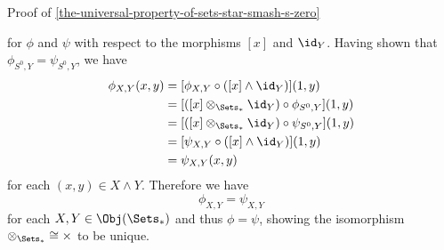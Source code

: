 \begin{Proof}{Proof of \cref{the-universal-property-of-sets-star-smash-s-zero}}
\begin{webcompile}
    \end{webcompile}
    for $\phi$ and $\psi$ with respect to the morphisms $[x]$ and $\id_{Y}$. Having shown that $\phi_{S^{0},Y}=\psi_{S^{0},Y}$, we have
    \begin{align*}
        \phi_{X,Y}(x,y) &= [\phi_{X,Y}\circ([x]\wedge\id_{Y})](1,y)\\
                        &= [([x]\otimes_{\Sets_{*}}\id_{Y})\circ\phi_{S^{0},Y}](1,y)\\
                        &= [([x]\otimes_{\Sets_{*}}\id_{Y})\circ\psi_{S^{0},Y}](1,y)\\
                        &= [\psi_{X,Y}\circ([x]\wedge\id_{Y})](1,y)\\%
                        &= \psi_{X,Y}(x,y)
    \end{align*}
    for each $(x,y)\in X\wedge Y$. Therefore we have
    \[
        \phi_{X,Y}%
        =%
        \psi_{X,Y}%
    \]%
    for each $X,Y\in\Obj(\Sets_{*})$ and thus $\phi=\psi$, showing the isomorphism $\mathord{\otimes_{\Sets_{*}}}\cong\mathord{\times}$ to be unique.
\end{Proof}
